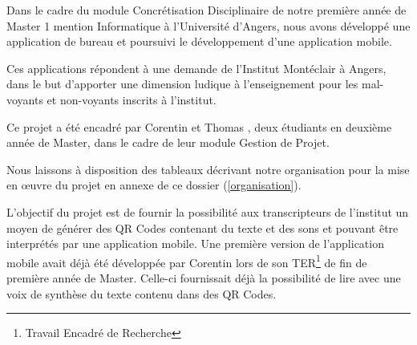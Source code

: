 
\par
Dans le cadre du module Concrétisation Disciplinaire de notre première année de Master 1 mention Informatique à l'Université d'Angers, nous avons développé une application de bureau et poursuivi le développement d'une application mobile.

\par
Ces applications répondent à une demande de l'Institut Montéclair à Angers, dans le but d'apporter une dimension ludique à l'enseignement pour les mal-voyants et non-voyants inscrits à l'institut.

\par
Ce projet a été encadré par Corentin  et Thomas , deux étudiants en deuxième année de Master, dans le cadre de leur module Gestion de Projet.
\par
Nous laissons à disposition des tableaux décrivant notre organisation pour la mise en œuvre du projet en annexe de ce dossier (\ref{organisation}).\\

\par
L'objectif du projet est de fournir la possibilité aux transcripteurs de l'institut un moyen de générer des QR Codes contenant du texte et des sons et pouvant être interprétés par une application mobile. Une première version de l'application mobile avait déjà été développée par Corentin  lors de son TER\footnote{Travail Encadré de Recherche} de fin de première année de Master. Celle-ci fournissait déjà la possibilité de lire avec une voix de synthèse du texte contenu dans des QR Codes.\\

